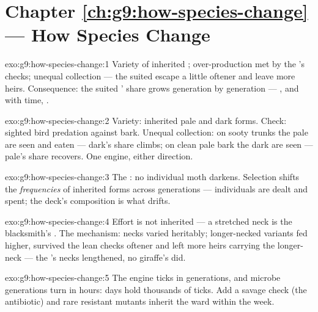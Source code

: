 \section*{Chapter \ref{ch:g9:how-species-change} --- How Species Change}

\begin{solution}{exo:g9:how-species-change:1}
Variety of inherited ; over-production met by the
's checks; unequal collection --- the suited
escape a little oftener and leave more heirs. Consequence:
the suited ' share grows generation by generation
--- , and with time, .
\end{solution}

\begin{solution}{exo:g9:how-species-change:2}
Variety: inherited pale and dark forms. Check: sighted
bird predation against bark. Unequal collection: on sooty
trunks the pale are seen and eaten --- dark's share
climbs; on clean pale bark the dark are seen --- pale's
share recovers. One engine, either direction.
\end{solution}

\begin{solution}{exo:g9:how-species-change:3}
The : no individual moth darkens. Selection
shifts the \emph{frequencies} of inherited forms across
generations --- individuals are dealt and spent; the
deck's composition is what drifts.
\end{solution}

\begin{solution}{exo:g9:how-species-change:4}
Effort is not inherited --- a stretched neck is the
blacksmith's . The mechanism: necks varied heritably;
longer-necked variants fed higher, survived the lean
checks oftener and left more heirs carrying the
longer-neck  --- the 's necks lengthened,
no giraffe's did.
\end{solution}

\begin{solution}{exo:g9:how-species-change:5}
The engine ticks in generations, and microbe generations
turn in hours: days hold thousands of ticks. Add a savage
check (the antibiotic) and rare resistant mutants inherit
the ward within the week.
\end{solution}


